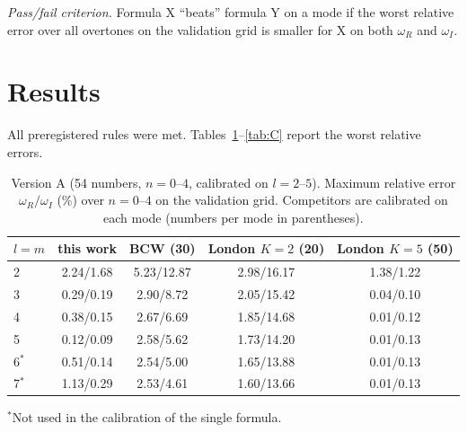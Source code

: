 \documentclass[prd,twocolumn,superscriptaddress,nofootinbib]{revtex4-2}
\begin{document}
\textit{Pass/fail criterion.} Formula X ``beats'' formula Y on a mode if the worst relative error over all overtones
on the validation grid is smaller for X on both $\omega_R$ and $\omega_I$.

\section{Results}

All preregistered rules were met. Tables~\ref{tab:A}--\ref{tab:C} report the worst relative errors.

\begin{table}[t]
\caption{Version A (54 numbers, $n=0$--$4$, calibrated on $l=2$--$5$). Maximum relative error
$\omega_R/\omega_I$ (\%) over $n=0$--$4$ on the validation grid. Competitors are calibrated on each mode (numbers per
mode in parentheses).}
\label{tab:A}
\begin{ruledtabular}
\begin{tabular}{lcccc}
$l=m$ & this work & BCW (30) & London $K{=}2$ (20) & London $K{=}5$ (50)\\ \hline
2 & 2.24/1.68 & 5.23/12.87 & 2.98/16.17 & 1.38/1.22\\
3 & 0.29/0.19 & 2.90/8.72 & 2.05/15.42 & 0.04/0.10\\
4 & 0.38/0.15 & 2.67/6.69 & 1.85/14.68 & 0.01/0.12\\
5 & 0.12/0.09 & 2.58/5.62 & 1.73/14.20 & 0.01/0.13\\
6$^*$ & 0.51/0.14 & 2.54/5.00 & 1.65/13.88 & 0.01/0.13\\
7$^*$ & 1.13/0.29 & 2.53/4.61 & 1.60/13.66 & 0.01/0.13\\
\end{tabular}
\end{ruledtabular}
\begin{flushleft}\footnotesize $^*$Not used in the calibration of the single formula.\end{flushleft}
\end{table}
\end{document}
